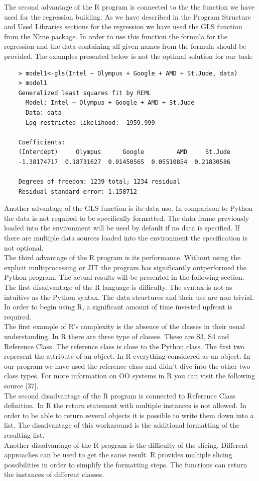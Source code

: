 \documentclass[
  twoside,
  11pt, a4paper,
  footinclude=true,
  headinclude=true,
  cleardoublepage=empty
]{scrreprt}
\begin{document}
    The second advantage of the R program is connected to the the function we have used for the regression building. As we have described in the Program Structure and Used Libraries sections for the regression we have used the GLS function from the Nlme package. In order to use this function the formula for the regression and the data containing all given names from the formula should be provided. The examples presented below is not the optimal solution for our task:
    \begin{verbatim}
    > model1<-gls(Intel ~ Olympus + Google + AMD + St.Jude, data)
    > model1
    Generalized least squares fit by REML
      Model: Intel ~ Olympus + Google + AMD + St.Jude 
      Data: data 
      Log-restricted-likelihood: -1959.999
    
    Coefficients:
    (Intercept)     Olympus      Google         AMD     St.Jude 
    -1.38174717  0.18731627  0.01450565  0.05510854  0.21830586 
    
    Degrees of freedom: 1239 total; 1234 residual
    Residual standard error: 1.158712
    \end{verbatim}
    Another advantage of the GLS function is its data use. In comparison to Python the data is not required to be specifically formatted. The data frame previously loaded into the environment will be used by default if no data is specified. If there are multiple data sources loaded into the environment the specification is not optional.\\
    The third advantage of the R program is its performance. Without using the explicit multiprocessing or JIT the program has significantly outperformed the Python program. The actual results will be presented in the following section.\\
    The first disadvantage of the R language is difficulty. The syntax is not as intuitive as the Python syntax. The data structures and their use are non trivial. In order to begin using R, a significant amount of time invested upfront is required.\\
    The first example of R's complexity is the absence of the classes in their usual understanding. In R there are three type of classes. These are S3, S4 and Reference Class. The reference class is close to the Python class. The first two represent the attribute of an object. In R everything considered as an object. In our program we have used the reference class and didn't dive into the other two class types. For more information on OO systems in R you can visit the following source [37]. \\
    The second disadvantage of the R program is connected to Reference Class definition. In R the return statement with multiple instances is not allowed. In order to be able to return several objects it is possible to write them down into a list. The disadvantage of this workaround is the additional formatting of the resulting list.\\
    Another disadvantage of the R program is the difficulty of the slicing. Different approaches can be used to get the same result. R provides multiple slicing possibilities in order to simplify the formatting steps. The functions can return the instances of different classes.
\end{document}
